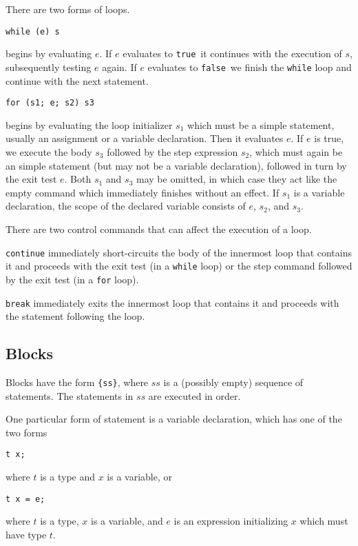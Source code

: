 \documentclass[11pt]{article}
\newcommand{\vtrue}{\texttt{true}}
\newcommand{\vfalse}{\texttt{false}}
\begin{document}
There are two forms of loops.

\begin{verbatim}
while (e) s
\end{verbatim}
begins by evaluating $e$.  If $e$ evaluates to \vtrue\ it
continues with the execution of $s$, subsequently testing $e$
again.  If $e$ evaluates to \vfalse\ we finish the \verb'while'
loop and continue with the next statement.

\begin{verbatim}
for (s1; e; s2) s3
\end{verbatim}
begins by evaluating the loop initializer $s_1$ which must be a simple
statement, usually an assignment or a variable declaration.  Then it
evaluates $e$.  If $e$ is true, we execute the body $s_3$ followed by
the step expression $s_2$, which must again be an simple statement
(but may not be a variable declaration), followed in turn by the exit
test $e$.  Both $s_1$ and $s_3$ may be omitted, in which case they act
like the empty command which immediately finishes without an effect.
If $s_1$ is a variable declaration, the scope of the declared variable
consists of $e$, $s_2$, and $s_3$.

There are two control commands that can affect the execution of a
loop.

\verb'continue' immediately short-circuits the body of the
innermost loop that contains it and proceeds with the exit test (in a
\verb'while' loop) or the step command followed by the exit test
(in a \verb'for' loop).

\verb'break' immediately exits the innermost loop that contains
it and proceeds with the statement following the loop.

\subsection{Blocks}

Blocks have the form \verb'{ss}', where $ss$ is a (possibly empty)
sequence of statements.  The statements in $ss$ are executed in order.

One particular form of statement is a variable declaration, which has
one of the two forms
\begin{verbatim}
t x;
\end{verbatim}
where $t$ is a type and $x$ is a variable, or
\begin{verbatim}
t x = e;
\end{verbatim}
where $t$ is a type, $x$ is a variable, and $e$ is
an expression initializing $x$ which must have type $t$.
\end{document}
